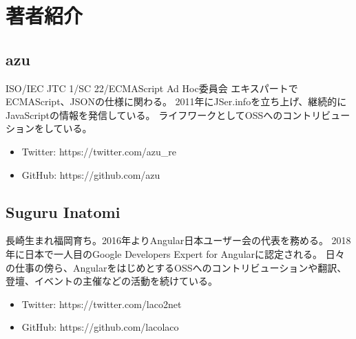 \hypertarget{authors}{%
\chapter*{著者紹介}\label{authors}}

\hypertarget{author-azu}{%
\section*{azu}\label{author-azu}}

ISO/IEC JTC 1/SC 22/ECMAScript Ad Hoc委員会
エキスパートでECMAScript、JSONの仕様に関わる。
2011年にJSer.infoを立ち上げ、継続的にJavaScriptの情報を発信している。
ライフワークとしてOSSへのコントリビューションをしている。

\begin{itemize}
\item
  Twitter: https://twitter.com/azu\_re
\item
  GitHub: https://github.com/azu
\end{itemize}

\hypertarget{author-suguru-inatomi}{%
\section*{Suguru Inatomi}\label{author-suguru-inatomi}}

長崎生まれ福岡育ち。2016年よりAngular日本ユーザー会の代表を務める。
2018年に日本で一人目のGoogle Developers Expert for Angularに認定される。
日々の仕事の傍ら、AngularをはじめとするOSSへのコントリビューションや翻訳、登壇、イベントの主催などの活動を続けている。

\begin{itemize}
\item
  Twitter: https://twitter.com/laco2net
\item
  GitHub: https://github.com/lacolaco
\end{itemize}
